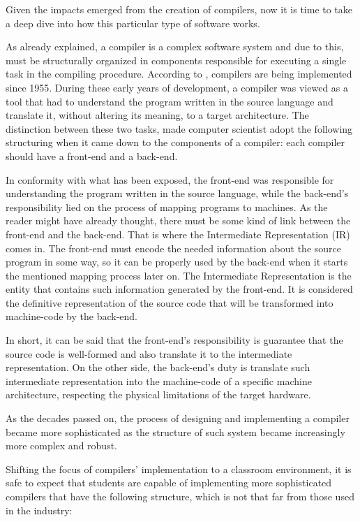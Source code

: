 Given the impacts emerged from the creation of compilers, now it is time to take a deep dive into how this particular type of software works.

As already explained, a compiler is a complex software system and due to this, must be structurally organized in components responsible for executing a single task in the compiling procedure. According to \cite{cooper2022engineering}, compilers are being implemented since 1955. During these early years of development, a compiler was viewed as a tool that had to understand the program written in the source language and translate it, without altering its meaning, to a target architecture. The distinction between these two tasks, made computer scientist adopt the following structuring when it came down to the components of a compiler: each compiler should have a front-end and a back-end. 

In conformity with what has been exposed, the front-end was responsible for understanding the program written in the source language, while the back-end's responsibility lied on the process of mapping programs to machines. As the reader might have already thought, there must be some kind of link between the front-end and the back-end. That is where the Intermediate Representation (IR) comes in. The front-end must encode the needed information about the source program in some way, so it can be properly used by the back-end when it starts the mentioned mapping process later on. The Intermediate Representation is the entity that contains such information generated by the front-end. It is considered the definitive representation of the source code that will be transformed into machine-code by the back-end.

In short, it can be said that the front-end's responsibility is guarantee that the source code is well-formed and also translate it to the intermediate representation. On the other side, the back-end's duty is translate such intermediate representation into the machine-code of a specific machine architecture, respecting the physical limitations of the target hardware.

As the decades passed on, the process of designing and implementing a compiler became more sophisticated as the structure of such system became increasingly more complex and robust.

Shifting the focus of compilers' implementation to a classroom environment, it is safe to expect that students are capable of implementing more sophisticated compilers that have the following structure, which is not that far from those used in the industry:

